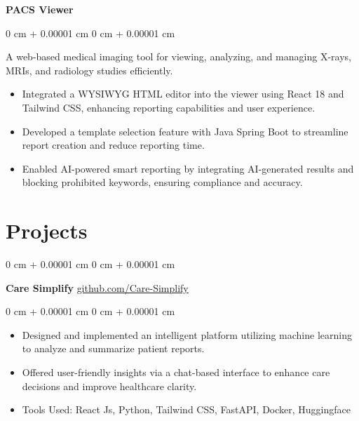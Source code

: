 \documentclass[10pt, letterpaper]{article}
\newenvironment{highlights}{
    \begin{itemize}[
        topsep=0.10 cm,
        parsep=0.10 cm,
        partopsep=0pt,
        itemsep=0pt,
        leftmargin=0 cm + 10pt
    ]
}{
    \end{itemize}
} %
\newenvironment{onecolentry}{
    \begin{adjustwidth}{
        0 cm + 0.00001 cm
    }{
        0 cm + 0.00001 cm
    }
}{
    \end{adjustwidth}
} %
\newenvironment{twocolentry}[2][]{
    \onecolentry
    \def\secondColumn{#2}
    \setcolumnwidth{\fill, 4.5 cm}
    \begin{paracol}{2}
}{
    \switchcolumn \raggedleft \secondColumn
    \end{paracol}
    \endonecolentry
} %
\begin{document}
    \textbf{PACS Viewer}
    \vspace{0.10 cm}
    \begin{onecolentry}
         \text A web-based medical imaging tool for viewing, analyzing, and managing X-rays, MRIs, and radiology studies efficiently.
        \begin{highlights}
             \item Integrated a WYSIWYG HTML editor into the viewer using React 18 and Tailwind CSS, enhancing reporting capabilities and user experience.  
        \item Developed a template selection feature with Java Spring Boot to streamline report creation and reduce reporting time.  
        \item Enabled AI-powered smart reporting by integrating AI-generated results and blocking prohibited keywords, ensuring compliance and accuracy.  
        \end{highlights}
    \end{onecolentry}




    \section{Projects}


        \begin{twocolentry}{
            \href{https://github.com/glunkad/Care-Simplify}{github.com/Care-Simplify}
        }
            \textbf{Care Simplify}\end{twocolentry}

        \vspace{0.10 cm}
        \begin{onecolentry}
            \begin{highlights}
                \item Designed and implemented an intelligent platform utilizing machine learning to analyze and summarize patient reports.
                \item Offered user-friendly insights via a chat-based interface to enhance care decisions and improve healthcare clarity.
                \item Tools Used: React Js, Python, Tailwind CSS, FastAPI, Docker, Huggingface
            \end{highlights}
        \end{onecolentry}


        \vspace{0.2 cm}
\end{document}

